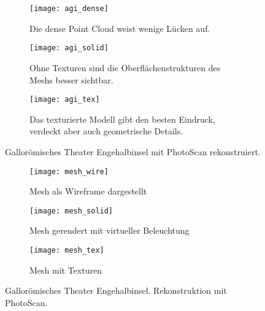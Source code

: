	\begin{figure}
		\begin{subfigure}{\textwidth}
			\texttt{[image: agi\_dense]}
			\label{app:agi_model_dense}
			\caption{Die dense Point Cloud weist wenige Lücken auf.}
		\end{subfigure}
		\begin{subfigure}{\textwidth}
			\texttt{[image: agi\_solid]}
			\label{app:agi_model_solid}
			\caption{Ohne Texturen sind die Oberflächenstrukturen des Meshs besser sichtbar.}
		\end{subfigure}
		\begin{subfigure}{\textwidth}
			\texttt{[image: agi\_tex]}
			\label{app:agi_model_tex}
			\caption{Das texturierte Modell gibt den besten Eindruck, verdeckt aber auch geometrische Details.}
		\end{subfigure}		
		\caption{Gallorömisches Theater Engehalbinsel mit PhotoScan rekonstruiert.}
		\label{app:agi_model}
	\end{figure}
	
	\begin{figure}
		\vspace*{-2.5cm}
		\begin{subfigure}{\textwidth}
			\texttt{[image: mesh\_wire]}
			\label{app:agi_wire}
			\caption{Mesh als Wireframe dargestellt}
		\end{subfigure}
		\begin{subfigure}{\textwidth}
			\texttt{[image: mesh\_solid]}
			\label{app:agi_solid}
			\caption{Mesh gerendert mit virtueller Beleuchtung}
		\end{subfigure}
		\begin{subfigure}{\textwidth}
			\texttt{[image: mesh\_tex]}
			\label{app:agi_tex}
			\caption{Mesh mit Texturen}
		\end{subfigure}
		\caption{Gallorömisches Theater Engehalbinsel. Rekonstruktion mit PhotoScan.}
		\label{app:mesh}
	\end{figure}
	

